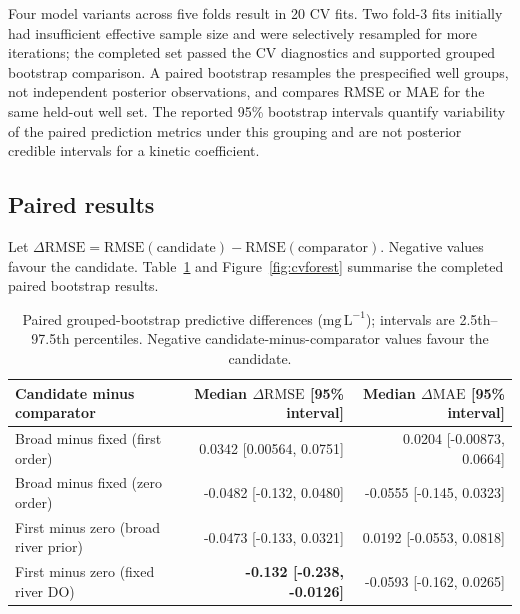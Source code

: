 \documentclass[11pt,a4paper]{article}
\newcommand{\mgL}{\mathrm{mg\,L^{-1}}}
\begin{document}
Four model variants across five folds result in 20 CV fits. Two fold-3 fits initially had insufficient effective sample size and were selectively resampled for more iterations; the completed set passed the CV diagnostics and supported grouped bootstrap comparison. A paired bootstrap resamples the prespecified well groups, not independent posterior observations, and compares RMSE or MAE for the same held-out well set. The reported 95\% bootstrap intervals quantify variability of the paired prediction metrics under this grouping and are not posterior credible intervals for a kinetic coefficient.

\subsection{Paired results}
Let \(\Delta\mathrm{RMSE}=\mathrm{RMSE}(\mathrm{candidate})-\mathrm{RMSE}(\mathrm{comparator})\). Negative values favour the candidate. Table~\ref{tab:cv} and Figure~\ref{fig:cvforest} summarise the completed paired bootstrap results.

\begin{table}[htbp]
\centering\small
\caption{Paired grouped-bootstrap predictive differences (\(\mgL\)); intervals are 2.5th--97.5th percentiles. Negative candidate-minus-comparator values favour the candidate.}
\label{tab:cv}
\begin{tabularx}{\linewidth}{>{\raggedright\arraybackslash}Xrr}
\toprule
Candidate minus comparator & Median \(\Delta\mathrm{RMSE}\) [95\% interval] & Median \(\Delta\mathrm{MAE}\) [95\% interval]\\
\midrule
Broad minus fixed (first order) & \phantom{-}0.0342 [0.00564, 0.0751] & \phantom{-}0.0204 [-0.00873, 0.0664]\\
Broad minus fixed (zero order) & -0.0482 [-0.132, 0.0480] & -0.0555 [-0.145, 0.0323]\\
First minus zero (broad river prior) & -0.0473 [-0.133, 0.0321] & \phantom{-}0.0192 [-0.0553, 0.0818]\\
First minus zero (fixed river DO) & \textbf{-0.132 [-0.238, -0.0126]} & -0.0593 [-0.162, 0.0265]\\
\bottomrule
\end{tabularx}
\end{table}
\end{document}
